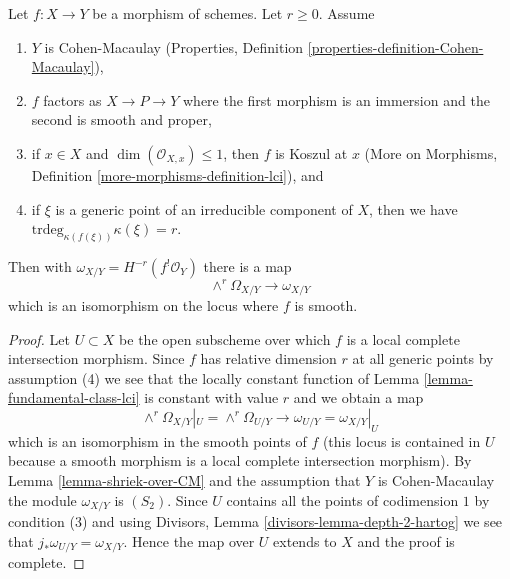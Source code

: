 \begin{lemma}
\label{lemma-fundamental-class-almost-lci}
Let $f : X \to Y$ be a morphism of schemes. Let $r \geq 0$. Assume
\begin{enumerate}
\item $Y$ is Cohen-Macaulay (Properties, Definition
\ref{properties-definition-Cohen-Macaulay}),
\item $f$ factors as $X \to P \to Y$ where the first morphism is
an immersion and the second is smooth and proper,
\item if $x \in X$ and $\dim(\mathcal{O}_{X, x}) \leq 1$,
then $f$ is Koszul at $x$ (More on Morphisms, Definition
\ref{more-morphisms-definition-lci}), and
\item if $\xi$ is a generic point of an irreducible component of $X$, then
we have
$\text{trdeg}_{\kappa(f(\xi))} \kappa(\xi) = r$.
\end{enumerate}
Then with $\omega_{X/Y} = H^{-r}(f^!\mathcal{O}_Y)$ there is a map
$$
\wedge^r\Omega_{X/Y} \longrightarrow \omega_{X/Y}
$$
which is an isomorphism on the locus where $f$ is smooth.
\end{lemma}

\begin{proof}
Let $U \subset X$ be the open subscheme over which $f$ is a
local complete intersection morphism. Since $f$ has relative
dimension $r$ at all generic points by assumption (4) we
see that the locally constant function of
Lemma \ref{lemma-fundamental-class-lci}
is constant with value $r$ and we obtain a map
$$
\wedge^r\Omega_{X/Y}|_U = \wedge^r \Omega_{U/Y}
\longrightarrow
\omega_{U/Y} = \omega_{X/Y}|_U
$$
which is an isomorphism in the smooth points of $f$ (this locus
is contained in $U$ because a smooth morphism is a local complete
intersection morphism). By Lemma \ref{lemma-shriek-over-CM}
and the assumption that $Y$ is Cohen-Macaulay
the module $\omega_{X/Y}$ is $(S_2)$.
Since $U$ contains all the points of codimension $1$ by condition (3)
and using Divisors, Lemma \ref{divisors-lemma-depth-2-hartog}
we see that $j_*\omega_{U/Y} = \omega_{X/Y}$.
Hence the map over $U$ extends to $X$ and the proof
is complete.
\end{proof}
